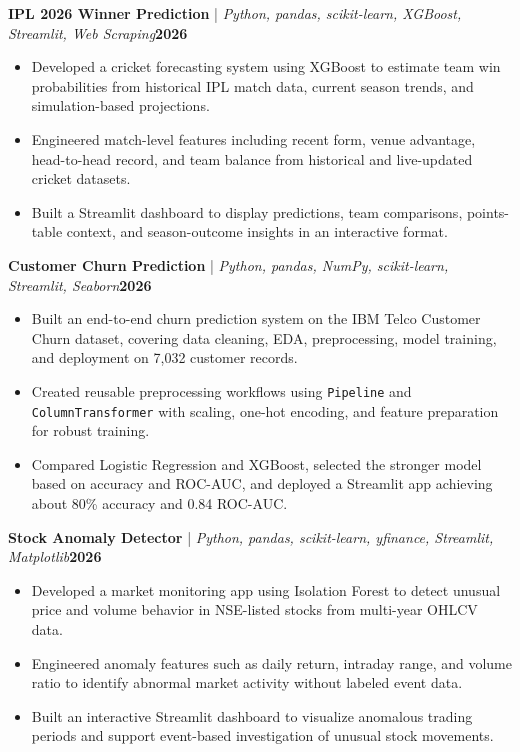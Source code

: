 \documentclass[10pt,a4paper]{article}
\newcommand{\resumeItem}[1]{\item \small{#1}}
\newcommand{\projectHeading}[3]{%
  \vspace{3pt}\noindent\textbf{#1} \;|\; \textit{\small #2}\hfill \textbf{\small #3}\par\vspace{-2pt}
}
\begin{document}
\projectHeading{IPL 2026 Winner Prediction}{Python, pandas, scikit-learn, XGBoost, Streamlit, Web Scraping}{2026}
\begin{itemize}
  \resumeItem{Developed a cricket forecasting system using XGBoost to estimate team win probabilities from historical IPL match data, current season trends, and simulation-based projections.}
  \resumeItem{Engineered match-level features including recent form, venue advantage, head-to-head record, and team balance from historical and live-updated cricket datasets.}
  \resumeItem{Built a Streamlit dashboard to display predictions, team comparisons, points-table context, and season-outcome insights in an interactive format.}
\end{itemize}

\projectHeading{Customer Churn Prediction}{Python, pandas, NumPy, scikit-learn, Streamlit, Seaborn}{2026}
\begin{itemize}
  \resumeItem{Built an end-to-end churn prediction system on the IBM Telco Customer Churn dataset, covering data cleaning, EDA, preprocessing, model training, and deployment on 7,032 customer records.}
  \resumeItem{Created reusable preprocessing workflows using \texttt{Pipeline} and \texttt{ColumnTransformer} with scaling, one-hot encoding, and feature preparation for robust training.}
  \resumeItem{Compared Logistic Regression and XGBoost, selected the stronger model based on accuracy and ROC-AUC, and deployed a Streamlit app achieving about 80\% accuracy and 0.84 ROC-AUC.}
\end{itemize}

\projectHeading{Stock Anomaly Detector}{Python, pandas, scikit-learn, yfinance, Streamlit, Matplotlib}{2026}
\begin{itemize}
  \resumeItem{Developed a market monitoring app using Isolation Forest to detect unusual price and volume behavior in NSE-listed stocks from multi-year OHLCV data.}
  \resumeItem{Engineered anomaly features such as daily return, intraday range, and volume ratio to identify abnormal market activity without labeled event data.}
  \resumeItem{Built an interactive Streamlit dashboard to visualize anomalous trading periods and support event-based investigation of unusual stock movements.}
\end{itemize}
\end{document}
